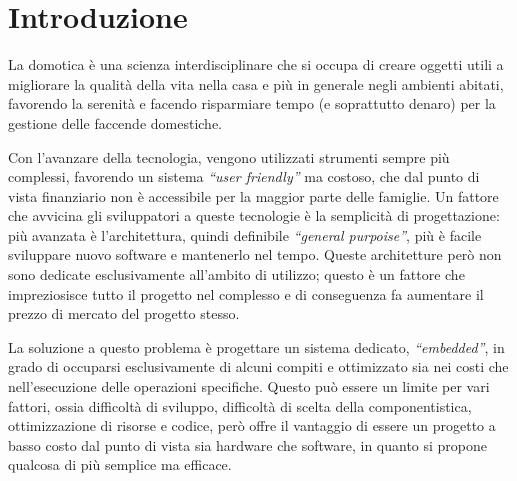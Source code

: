 \documentclass[a4paper,titlepage]{book}
\begin{document}
\begin{frontespizio}
\end{frontespizio}





\chapter*{Introduzione}
La domotica è una scienza interdisciplinare che si occupa di creare oggetti utili a migliorare la qualità della vita nella casa e più in generale negli ambienti abitati, favorendo la serenità e facendo risparmiare tempo (e soprattutto denaro) per la gestione delle faccende domestiche.
 
Con l'avanzare della tecnologia, vengono utilizzati strumenti sempre più complessi, favorendo un sistema \textit{``user friendly''} ma costoso, che dal punto di vista finanziario non è accessibile per la maggior parte delle famiglie. Un fattore che avvicina gli sviluppatori a queste tecnologie è la semplicità di progettazione: più avanzata è l'architettura, quindi definibile \textit{``general purpoise''}, più è facile sviluppare nuovo software e mantenerlo nel tempo. Queste architetture però non sono dedicate esclusivamente all'ambito di utilizzo; questo è un fattore che impreziosisce tutto il progetto nel complesso e di conseguenza fa aumentare il prezzo di mercato del progetto stesso.

La soluzione a questo problema è progettare un sistema dedicato, \textit{``embedded''}, in grado di occuparsi esclusivamente di alcuni compiti e ottimizzato sia nei costi che nell'esecuzione delle operazioni specifiche. Questo può essere un limite per vari fattori, ossia difficoltà di sviluppo, difficoltà di scelta della componentistica, ottimizzazione di risorse e codice, però offre il vantaggio di essere un progetto a basso costo dal punto di vista sia hardware che software, in quanto si propone qualcosa di più semplice ma efficace.
\end{document}
